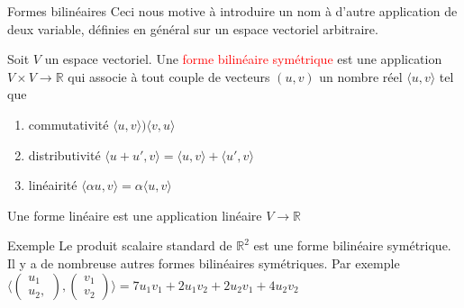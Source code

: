         \begin{parag}{Formes bilinéaires}
            Ceci nous motive à introduire un nom à d'autre application de deux variable, définies en général sur un espace vectoriel arbitraire.
            \begin{deinition}
                Soit $V$ un espace vectoriel. Une \textcolor{red}{forme bilinéaire symétrique} est une application $V \times V \to \mathbb{R}$ qui associe à tout couple de vecteurs $(u, v)$ un nombre réel $\langle u, v \rangle$ tel que
                \begin{enumerate}
                    \item commutativité $\langle u, v \rangle ) \langle v, u \rangle$
                    \item distributivité $\langle u + u', v \rangle = \langle u, v \rangle + \langle u' , v \rangle$
                    \item linéairité $\langle \alpha u, v \rangle = \alpha \langle u, v \rangle$
                \end{enumerate}
                \begin{framedremark}
                    Une forme linéaire est une application linéaire $V \to \mathbb{R}$
                \end{framedremark}
            \end{deinition}
            \begin{subparag}{Exemple}
                Le produit scalaire standard de $\mathbb{R}^2$ est une forme bilinéaire symétrique.
                \\
                Il y a de nombreuse autres formes bilinéaires symétriques. Par exemple $\langle \begin{pmatrix}
                    u_1 \\ u_2,  
                \end{pmatrix}, \begin{pmatrix}
                    v_1 \\ v_2
                \end{pmatrix}\rangle = 7u_1v_1 + 2u_1v_2 + 2u_2v_1 + 4u_2v_2$
            \end{subparag}
        
        \end{parag}

